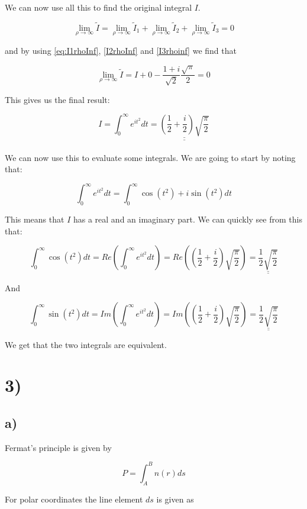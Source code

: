 \documentclass[a4paper,norsk, 10pt]{article}
\begin{document}
We can now use all this to find the original integral $I$.

$$
\lim_{\rho \rightarrow \infty} \tilde{I} = \lim_{\rho \rightarrow \infty} \tilde{I}_1 + \lim_{\rho \rightarrow \infty} \tilde{I}_2 + \lim_{\rho \rightarrow \infty} \tilde{I}_3 = 0
$$

and by using \eqref{eq:I1rhoInf}, \eqref{I2rhoInf} and \eqref{I3rhoinf} we find that

$$
\lim_{\rho \rightarrow \infty} \tilde{I} = I + 0 - \frac{1+i}{\sqrt{2}} \frac{\sqrt{\pi}}{2} = 0
$$

This gives us the final result:

$$
I = \int_0^{\infty}e^{it^2}dt =\underline{\underline{\left(\frac{1}{2} +\frac{i}{2}\right) \sqrt{\frac{\pi}{2}}}}
$$\\

We can now use this to evaluate some integrals. We are going to start by noting that:

$$
\int_0^{\infty}e^{it^2}dt = \int_0^{\infty} \cos(t^2) + i\sin(t^2)dt
$$

This means that $I$ has a real and an imaginary part. We can quickly see from this that:

$$
\int_0^{\infty} \cos(t^2)dt = Re(\int_0^{\infty}e^{it^2}dt) = Re\left(\left(\frac{1}{2} +\frac{i}{2}\right) \sqrt{\frac{\pi}{2}}\right) = \underline{\underline{\frac{1}{2}\sqrt{\frac{\pi}{2}}}}
$$

And

$$
\int_0^{\infty} \sin(t^2)dt = Im(\int_0^{\infty}e^{it^2}dt) = Im\left(\left(\frac{1}{2} +\frac{i}{2}\right) \sqrt{\frac{\pi}{2}}\right) = \underline{\underline{\frac{1}{2}\sqrt{\frac{\pi}{2}}}}
$$

We get that the two integrals are equivalent. 


\newpage
\section*{3)}
\subsection*{a)}

Fermat's principle is given by

\begin{equation}
P = \int_A^B n(r) ds
\end{equation}

For polar coordinates the line element $ds$ is given as 
\end{document}
